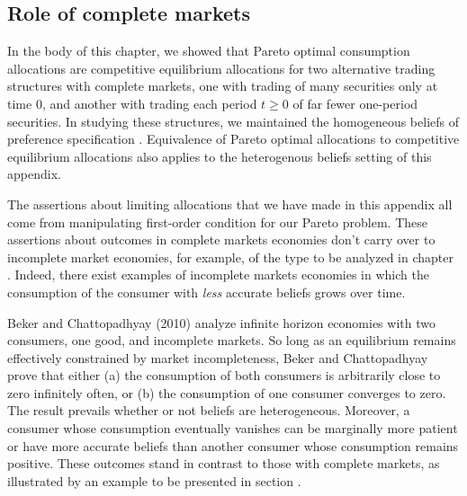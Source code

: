 \subsection{Role of complete markets}
In the body of this chapter, we showed that   Pareto optimal  consumption allocations are  competitive equilibrium allocations
for two alternative trading structures with complete markets, one with  trading of many securities only at time $0$, and another with trading each
period $t \geq 0$ of far fewer one-period securities.  In studying these structures, we maintained the
homogeneous beliefs  of preference specification .  Equivalence of  Pareto optimal allocations to competitive equilibrium allocations
 also applies to the heterogenous beliefs setting of this appendix.

The assertions about limiting allocations that we have made in  this appendix  all come from manipulating  first-order condition  for our  Pareto problem. These assertions about  outcomes in complete markets economies don't carry over to
incomplete market economies, for example, of the type to be analyzed in chapter .   Indeed, there exist examples of incomplete markets
economies in which the consumption of the consumer with {\it less\/} accurate beliefs grows over time.

%
%
%
%
%





Beker and Chattopadhyay (2010) analyze infinite horizon
economies with two consumers, one good, and incomplete markets.
So long as an equilibrium remains effectively constrained
by market incompleteness, Beker and Chattopadhyay prove that either (a) the consumption
of both consumers is arbitrarily close to zero infinitely often,
or (b) the consumption of one consumer
converges to zero. The result prevails  whether or not
beliefs are  heterogeneous. Moreover, a consumer whose consumption eventually
vanishes can be marginally more patient or have  more
accurate beliefs than another consumer whose consumption remains positive.  These outcomes stand in contrast to
those  with complete markets, as illustrated
by an  example to be presented in section .

%
%

